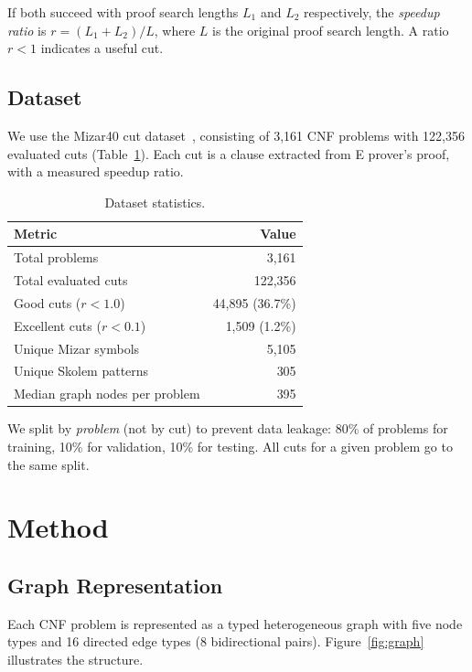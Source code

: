 \documentclass{article}
\begin{document}
If both succeed with proof search lengths $L_1$ and $L_2$ respectively, the
\emph{speedup ratio} is $r = (L_1 + L_2) / L$, where $L$ is the original proof
search length. A ratio $r < 1$ indicates a useful cut.

\subsection{Dataset}

We use the Mizar40 cut dataset~\cite{kaliszyk2015mizar40}, consisting of 3,161 CNF
problems with 122,356 evaluated cuts (Table~\ref{tab:dataset}). Each cut is a clause
extracted from E prover's proof, with a measured speedup ratio.

\begin{table}[t]
\centering
\caption{Dataset statistics.}
\label{tab:dataset}
\begin{tabular}{lr}
\toprule
\textbf{Metric} & \textbf{Value} \\
\midrule
Total problems & 3,161 \\
Total evaluated cuts & 122,356 \\
Good cuts ($r < 1.0$) & 44,895 (36.7\%) \\
Excellent cuts ($r < 0.1$) & 1,509 (1.2\%) \\
Unique Mizar symbols & 5,105 \\
Unique Skolem patterns & 305 \\
Median graph nodes per problem & 395 \\
\bottomrule
\end{tabular}
\end{table}

We split by \emph{problem} (not by cut) to prevent data leakage: 80\% of problems for
training, 10\% for validation, 10\% for testing. All cuts for a given problem go to
the same split.

\section{Method}
\label{sec:method}

\subsection{Graph Representation}
\label{sec:graph}

Each CNF problem is represented as a typed heterogeneous graph with five node types
and 16 directed edge types (8 bidirectional pairs). Figure~\ref{fig:graph} illustrates
the structure.
\end{document}

